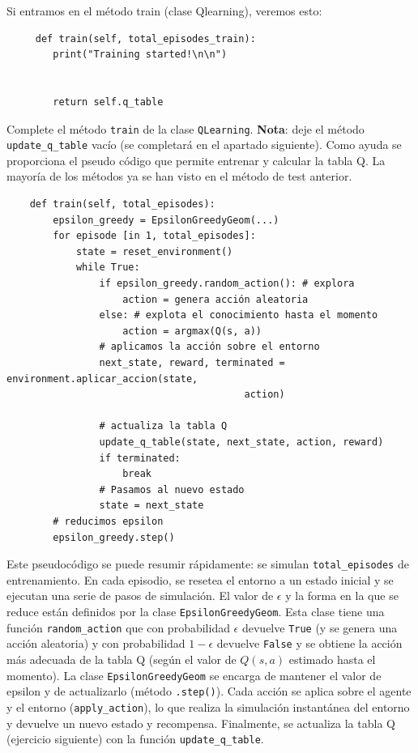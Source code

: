 \documentclass{article}
\begin{document}
\begin{exercise}
Si entramos en el método train (clase Qlearning), veremos esto:
\begin{verbatim}
     def train(self, total_episodes_train):
        print("Training started!\n\n")

        
        return self.q_table  
\end{verbatim}
    Complete el método \texttt{train} de la clase \texttt{QLearning}. \textbf{Nota}: deje el método \texttt{update\_q\_table} vacío (se completará en el apartado siguiente). Como ayuda se proporciona el pseudo código que permite entrenar y calcular la tabla Q. La mayoría de los métodos ya se han visto en el método de test anterior.
\begin{verbatim}
    def train(self, total_episodes):
        epsilon_greedy = EpsilonGreedyGeom(...)
        for episode [in 1, total_episodes]:
            state = reset_environment()
            while True:                
                if epsilon_greedy.random_action(): # explora
                    action = genera acción aleatoria
                else: # explota el conocimiento hasta el momento
                    action = argmax(Q(s, a))
                # aplicamos la acción sobre el entorno
                next_state, reward, terminated = environment.aplicar_accion(state, 
                                         action)
               
                # actualiza la tabla Q
                update_q_table(state, next_state, action, reward)                
                if terminated:                    
                    break
                # Pasamos al nuevo estado
                state = next_state
        # reducimos epsilon 
        epsilon_greedy.step()
\end{verbatim}
\end{exercise}

Este pseudocódigo se puede resumir rápidamente: se simulan \texttt{total\_episodes} de entrenamiento. En cada episodio, se resetea el entorno a un estado inicial y se ejecutan una serie de pasos de simulación. El valor de $\epsilon$ y la forma en la que se reduce están definidos por la clase \texttt{EpsilonGreedyGeom}. Esta clase tiene una función \texttt{random\_action} que con probabilidad $\epsilon$ devuelve \texttt{True} (y se genera una acción aleatoria) y con probabilidad $1-\epsilon$ devuelve \texttt{False} y se obtiene la acción más adecuada de la tabla Q (según el valor de $Q(s,a)$ estimado hasta el momento). La clase \texttt{EpsilonGreedyGeom} se encarga de mantener el valor de epsilon y de actualizarlo (método \texttt{.step()}).  Cada acción se aplica sobre el agente y el entorno (\texttt{apply\_action}), lo que realiza la simulación instantánea del entorno y devuelve un nuevo estado y recompensa. Finalmente, se actualiza la tabla Q (ejercicio siguiente) con la función \texttt{update\_q\_table}. 
\end{document}
